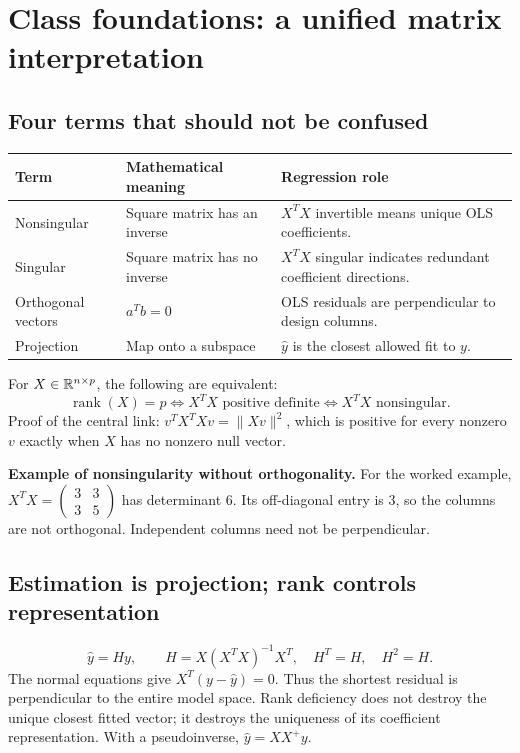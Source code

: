 \documentclass[11pt]{article}
\begin{document}
\section{Class foundations: a unified matrix interpretation}
\subsection{Four terms that should not be confused}
\par\smallskip
\begin{tabularx}{\linewidth}{p{.18\linewidth}LL}\toprule
Term&Mathematical meaning&Regression role\\\midrule
Nonsingular&Square matrix has an inverse&$X^TX$ invertible means unique OLS coefficients.\\
Singular&Square matrix has no inverse&$X^TX$ singular indicates redundant coefficient directions.\\
Orthogonal vectors&$a^Tb=0$&OLS residuals are perpendicular to design columns.\\
Projection&Map onto a subspace&$\widehat y$ is the closest allowed fit to $y$.\\\bottomrule
\end{tabularx}
\par\smallskip

For $X\in\mathbb R^{n\times p}$, the following are equivalent:
\[
\boxed{\operatorname{rank}(X)=p
\iff X^TX\text{ positive definite}
\iff X^TX\text{ nonsingular}.}
\]
Proof of the central link: $v^TX^TXv=\|Xv\|^2$, which is positive for every nonzero $v$ exactly when $X$ has no nonzero null vector.

\textbf{Example of nonsingularity without orthogonality.}
For the worked example, $X^TX=\begin{pmatrix}3&3\\3&5\end{pmatrix}$ has determinant 6. Its off-diagonal entry is 3, so the columns are not orthogonal. Independent columns need not be perpendicular.

\subsection{Estimation is projection; rank controls representation}
\[
\widehat y=Hy,\qquad H=X(X^TX)^{-1}X^T,
\quad H^T=H,\quad H^2=H.
\]
The normal equations give $X^T(y-\widehat y)=0$. Thus the shortest residual is perpendicular to the entire model space. Rank deficiency does not destroy the unique closest fitted vector; it destroys the uniqueness of its coefficient representation. With a pseudoinverse, $\widehat y=XX^+y$.
\end{document}
